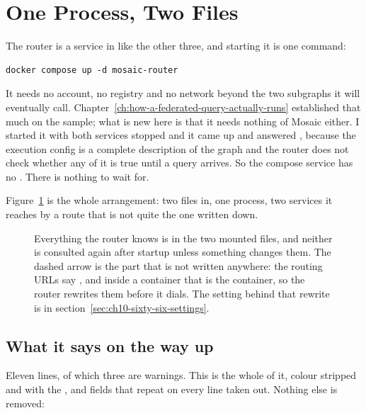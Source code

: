 \section{One Process, Two Files}
\label{sec:ch10-one-process-two-files}
%

The router is a service in  like the other three, and
starting it is one command:

\begin{verbatim}
docker compose up -d mosaic-router
\end{verbatim}

%
It needs no account, no registry and no network beyond the two subgraphs it
will eventually call. Chapter~\ref{ch:how-a-federated-query-actually-runs}
established that much on the sample; what is new here is that it needs nothing
of Mosaic either. I started it with both services stopped and it came up and
answered , because the execution config is a complete description
of the graph and the router does not check whether any of it is true until a
query arrives. So the compose service has no . There is
nothing to wait for.

Figure~\ref{fig:ch10-what-it-loads} is the whole arrangement: two files in, one
process, two services it reaches by a route that is not quite the one written
down.

\begin{figure}[htbp]
  \centering
  
  \caption{Everything the router knows is in the two mounted files, and neither
  is consulted again after startup unless something changes them. The dashed
  arrow is the part that is not written anywhere: the routing URLs say
  , and inside a container that is the container, so the router
  rewrites them before it dials. The setting behind that rewrite is in
  section~\ref{sec:ch10-sixty-six-settings}.}
  \label{fig:ch10-what-it-loads}
\end{figure}

\subsection*{What it says on the way up}

%
Eleven lines, of which three are warnings. This is the whole of it, colour
stripped and with the ,  and 
fields that repeat on every line taken out. Nothing else is removed:

